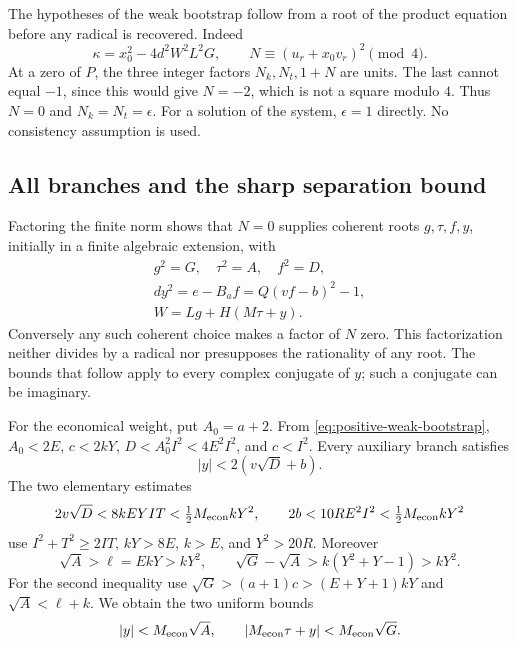 The hypotheses of the weak bootstrap follow from a root of the product
equation before any radical is recovered.  Indeed
\[
 \kappa=x_0^2-4d^2W^2L^2G,
 \qquad N\equiv(u_r+x_0v_r)^2\pmod4.
\]
At a zero of $P$, the three integer factors $N_k,N_t,1+N$ are units.
The last cannot equal $-1$, since this would give $N=-2$, which is not a
square modulo $4$.  Thus $N=0$ and $N_k=N_t=\epsilon$.  For a solution
of the system, $\epsilon=1$ directly.  No consistency assumption is used.

\subsection{All branches and the sharp separation bound}

Factoring the finite norm shows that $N=0$ supplies coherent roots
$g,\tau,f,y$, initially in a finite algebraic extension, with
\begin{equation}
 \begin{gathered}
 g^2=G,\quad \tau^2=A,\quad f^2=D,\\
 dy^2=e-B_af=Q(vf-b)^2-1,\\
 W=Lg+H(M\tau+y).
 \end{gathered}\label{eq:coherent-positive-roots}
\end{equation}
Conversely any such coherent choice makes a factor of $N$ zero.  This
factorization neither divides by a radical nor presupposes the rationality
of any root.  The bounds that follow apply to every complex conjugate of
$y$; such a conjugate can be imaginary.

For the economical weight, put $A_0=a+2$.  From
\eqref{eq:positive-weak-bootstrap},
$A_0<2E$, $c<2kY$, $D<A_0^2I^2<4E^2I^2$, and $c<I^2$.
Every auxiliary branch satisfies
\[
 |y|<2(v\sqrt D+b).
\]
The two elementary estimates
\[
 2v\sqrt D<8kEYIT<\tfrac12M_{\rm econ}kY^2,
 \qquad
 2b<10RE^2I^2<\tfrac12M_{\rm econ}kY^2
\]
use $I^2+T^2\ge2IT$, $kY>8E$, $k>E$, and $Y^2>20R$.
Moreover
\[
 \sqrt A>\ell=EkY>kY^2,
 \qquad \sqrt G-\sqrt A>k(Y^2+Y-1)>kY^2.
\]
For the second inequality use
$\sqrt G>(a+1)c>(E+Y+1)kY$ and
$\sqrt A<\ell+k$.  We obtain the two uniform bounds
\begin{equation}
 |y|<M_{\rm econ}\sqrt A,
 \qquad |M_{\rm econ}\tau+y|<M_{\rm econ}\sqrt G.
 \label{eq:economical-separation}
\end{equation}

